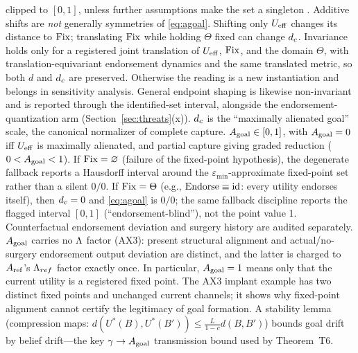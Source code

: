 clipped to $[0,1]$, unless further assumptions make the set a singleton
\citep{ziebart2008}. Additive shifts are \emph{not} generally symmetries of
\eqref{eq:agoal}. Shifting only $U_{\mathrm{eff}}$ changes its distance to $\mathrm{Fix}$;
translating $\mathrm{Fix}$ while holding $\Theta$ fixed can change $d_{c}$. Invariance
holds only for a registered joint translation of $U_{\mathrm{eff}}$, $\mathrm{Fix}$, and the
domain $\Theta$, with translation-equivariant endorsement dynamics and the
same translated metric, so both $d$ and $d_{c}$ are preserved. Otherwise the
reading is a new instantiation and belongs in sensitivity analysis. General
endpoint shaping is likewise non-invariant and is reported through the
identified-set interval, alongside the endorsement-quantization arm
(Section~\ref{sec:threats}(x)). $d_{c}$ is the ``maximally alienated goal''
scale, the canonical normalizer of complete capture. $A_{\mathrm{goal}}\in[0,1]$, with
$A_{\mathrm{goal}}=0$ iff $U_{\mathrm{eff}}$ is maximally alienated, and partial capture giving
graded reduction ($0<A_{\mathrm{goal}}<1$). If $\mathrm{Fix}=\varnothing$ (failure of the
fixed-point hypothesis), the degenerate fallback reports a Hausdorff interval
around the $\varepsilon_{\min}$-approximate fixed-point set rather than a
silent $0/0$. If $\mathrm{Fix}=\Theta$ (e.g., $\mathrm{Endorse}\equiv\mathrm{id}$: every utility endorses
itself), then $d_{c}=0$ and \eqref{eq:agoal} is $0/0$; the same fallback
discipline reports the flagged interval $[0,1]$ (``endorsement-blind''),
not the point value 1. Counterfactual endorsement deviation and surgery
history are audited separately. $A_{\mathrm{goal}}$ carries no $\Lambda$ factor (AX3):
present structural alignment and actual/no-surgery endorsement output
deviation are distinct, and the latter is charged to $A_{\mathrm{ref}}$'s $\Lambda_{ref}$
factor exactly once. In particular, $A_{\mathrm{goal}}=1$ means only that the current
utility is a registered fixed point. The AX3 implant example has two distinct
fixed points and unchanged current channels; it shows why fixed-point
alignment cannot certify the legitimacy of goal formation. A
stability lemma (compression maps: $d(U^*(B),U^*(B'))\le
\frac{L}{1-c}d(B,B')$) bounds goal drift by belief drift---the key
$\gamma\to A_{\mathrm{goal}}$ transmission bound used by Theorem~T6.

